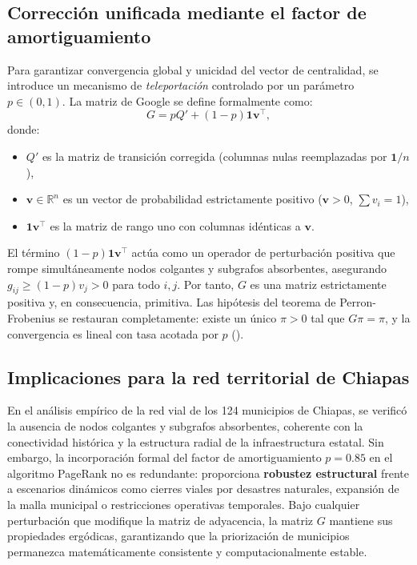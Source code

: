 \documentclass[
  spanish,
  us-letterpaper,
]{scrreprt}
\providecommand{\tightlist}{%
  \setlength{\itemsep}{0pt}\setlength{\parskip}{0pt}}
\numberwithin{equation}{section}
\begin{document}
\subsection{Corrección unificada mediante el factor de
amortiguamiento}\label{correcciuxf3n-unificada-mediante-el-factor-de-amortiguamiento}

Para garantizar convergencia global y unicidad del vector de
centralidad, se introduce un mecanismo de \emph{teleportación}
controlado por un parámetro \(p \in (0,1)\). La matriz de Google se
define formalmente como: \[
G = pQ' + (1-p)\mathbf{1}\mathbf{v}^\top,
\] donde:

\begin{itemize}
\tightlist
\item
  \(Q'\) es la matriz de transición corregida (columnas nulas
  reemplazadas por \(\mathbf{1}/n\)),
\item
  \(\mathbf{v} \in \mathbb{R}^n\) es un vector de probabilidad
  estrictamente positivo (\(\mathbf{v} > 0\), \(\sum v_i = 1\)),
\item
  \(\mathbf{1}\mathbf{v}^\top\) es la matriz de rango uno con columnas
  idénticas a \(\mathbf{v}\).
\end{itemize}

El término \((1-p)\mathbf{1}\mathbf{v}^\top\) actúa como un operador de
perturbación positiva que rompe simultáneamente nodos colgantes y
subgrafos absorbentes, asegurando \(g_{ij} \geq (1-p)v_j > 0\) para todo
\(i,j\). Por tanto, \(G\) es una matriz estrictamente positiva y, en
consecuencia, primitiva. Las hipótesis del teorema de Perron-Frobenius
se restauran completamente: existe un único \(\pi > 0\) tal que
\(G\pi = \pi\), y la convergencia es lineal con tasa acotada por \(p\)
().

\subsection{Implicaciones para la red territorial de
Chiapas}\label{implicaciones-para-la-red-territorial-de-chiapas}

En el análisis empírico de la red vial de los 124 municipios de Chiapas,
se verificó la ausencia de nodos colgantes y subgrafos absorbentes,
coherente con la conectividad histórica y la estructura radial de la
infraestructura estatal. Sin embargo, la incorporación formal del factor
de amortiguamiento \(p = 0.85\) en el algoritmo PageRank no es
redundante: proporciona \textbf{robustez estructural} frente a
escenarios dinámicos como cierres viales por desastres naturales,
expansión de la malla municipal o restricciones operativas temporales.
Bajo cualquier perturbación que modifique la matriz de adyacencia, la
matriz \(G\) mantiene sus propiedades ergódicas, garantizando que la
priorización de municipios permanezca matemáticamente consistente y
computacionalmente estable.
\end{document}
